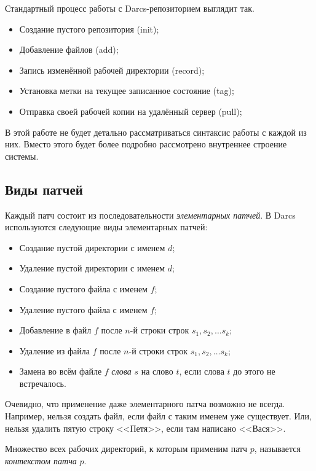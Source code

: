 Стандартный процесс работы с Darcs-репозиторием выглядит так. 

\begin{itemize}
\item Создание пустого репозитория (init);
\item Добавление файлов (add);
\item Запись изменённой рабочей директории (record);
\item Установка метки на текущее записанное состояние (tag);
\item Отправка своей рабочей копии на удалённый сервер (pull);
\end{itemize}

В этой работе не будет детально рассматриваться синтаксис работы с
каждой из них. Вместо этого будет более подробно рассмотрено
внутреннее строение системы.

\subsection{Виды патчей}

Каждый патч состоит из последовательности \emph{элементарных патчей}. 
В Darcs используются следующие виды элементарных патчей:

\begin{definition}
\begin{itemize}
\item Создание пустой директории с именем $d$;
\item Удаление пустой директории с именем $d$;
\item Создание пустого файла с именем $f$;
\item Удаление пустого файла с именем $f$;
\item Добавление в файл $f$ после $n$-й строки строк $s_1, s_2, \ldots s_k$;
\item Удаление из файла $f$ после $n$-й строки строк $s_1, s_2, \ldots s_k$;
\item Замена во всём файле $f$ \emph{слова} $s$ на слово $t$, если
  слова $t$ до этого не встречалось.
\end{itemize}
\end{definition}

Очевидно, что применение даже элементарного патча возможно не всегда.
Например, нельзя создать файл, если файл с таким именем уже
существует. Или, нельзя удалить пятую строку <<Петя>>, если там
написано <<Вася>>.

\begin{definition}[Контекст]
  Множество всех рабочих директорий, к которым применим патч $p$,
  называется \emph{контекстом патча} $p$.
\end{definition}

